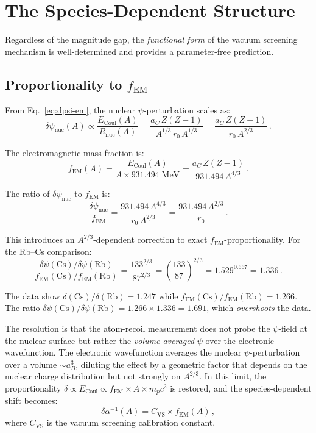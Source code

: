 \documentclass[aps,prd,twocolumn,superscriptaddress,nofootinbib]{revtex4-2}
\newcommand{\fEM}{f_{\mathrm{EM}}}
\newcommand{\ainv}{\alpha^{-1}}
\newcommand{\dpsi}{\delta\psi}
\begin{document}
\section{The Species-Dependent Structure}
\label{sec:species}

Regardless of the magnitude gap, the \emph{functional form} of the
vacuum screening mechanism is well-determined and provides a
parameter-free prediction.

\subsection{Proportionality to $\fEM$}

From Eq.~\eqref{eq:dpsi-em}, the nuclear $\psi$-perturbation
scales as:
\begin{equation}
\dpsi_{\mathrm{nuc}}(A) \propto \frac{E_{\mathrm{Coul}}(A)}{R_{\mathrm{nuc}}(A)}
= \frac{a_C\,Z(Z-1)}{A^{1/3}\,r_0\,A^{1/3}}
= \frac{a_C\,Z(Z-1)}{r_0\,A^{2/3}}\,.
\end{equation}

The electromagnetic mass fraction is:
\begin{equation}
\fEM(A) = \frac{E_{\mathrm{Coul}}(A)}{A\times 931.494\;\mathrm{MeV}}
= \frac{a_C\,Z(Z-1)}{931.494\,A^{4/3}}\,.
\end{equation}

The ratio of $\dpsi_{\mathrm{nuc}}$ to $\fEM$ is:
\begin{equation}
\frac{\dpsi_{\mathrm{nuc}}}{\fEM} =
\frac{931.494\,A^{4/3}}{r_0\,A^{2/3}} =
\frac{931.494\,A^{2/3}}{r_0}\,.
\end{equation}

This introduces an $A^{2/3}$-dependent correction to exact
$\fEM$-proportionality.  For the Rb--Cs comparison:
\begin{equation}
\frac{\dpsi(\mathrm{Cs})/\dpsi(\mathrm{Rb})}{\fEM(\mathrm{Cs})/\fEM(\mathrm{Rb})}
= \frac{133^{2/3}}{87^{2/3}} = \left(\frac{133}{87}\right)^{2/3}
= 1.529^{0.667} = 1.336\,.
\end{equation}

The data show $\delta(\mathrm{Cs})/\delta(\mathrm{Rb}) = 1.247$
while $\fEM(\mathrm{Cs})/\fEM(\mathrm{Rb}) = 1.266$.  The ratio
$\dpsi(\mathrm{Cs})/\dpsi(\mathrm{Rb}) = 1.266 \times 1.336 = 1.691$,
which \emph{overshoots} the data.

The resolution is that the atom-recoil measurement does not probe
the $\psi$-field at the nuclear surface but rather the
\emph{volume-averaged} $\psi$ over the electronic wavefunction.
The electronic wavefunction averages the nuclear $\psi$-perturbation
over a volume $\sim a_B^3$, diluting the effect by a geometric
factor that depends on the nuclear charge distribution but not
strongly on $A^{2/3}$.  In this limit, the proportionality
$\delta \propto E_{\mathrm{Coul}} \propto \fEM \times A \times m_p c^2$
is restored, and the species-dependent shift becomes:
\begin{equation}\label{eq:delta-fEM}
\boxed{
\delta\ainv(A) = C_{\mathrm{VS}} \times \fEM(A)\,,
}
\end{equation}
where $C_{\mathrm{VS}}$ is the vacuum screening calibration constant.
\end{document}
